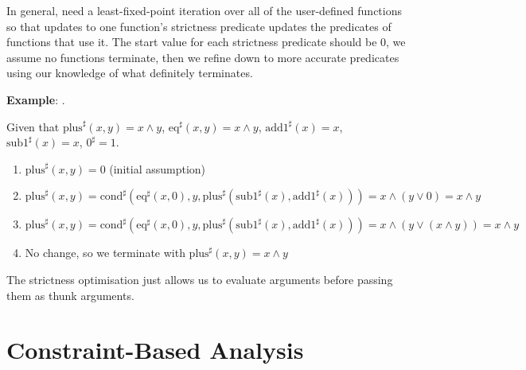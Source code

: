 \documentclass[a4paper, 11pt]{article}
\begin{document}
{    In general, need a least-fixed-point iteration over all of the user-defined functions so that updates to one function's strictness predicate updates the predicates of functions that use it. The start value for each strictness predicate should be 0, we assume no functions terminate, then we refine down to more accurate predicates using our knowledge of what definitely terminates.

    \textbf{Example}: .

    Given that \(\text{plus}^\sharp(x,y) = x \wedge y\), \(\text{eq}^\sharp(x,y) = x \wedge y\), \(\text{add1}^\sharp(x) = x\), \(\text{sub1}^\sharp(x) = x\), \(0^\sharp = 1\).
    \begin{enumerate}
    \item \(\text{plus}^\sharp(x, y) = 0\) (initial assumption)
    \item \(\text{plus}^\sharp(x, y) = \text{cond}^\sharp(\text{eq}^\sharp(x,0), y, \text{plus}^\sharp(\text{sub1}^\sharp(x), \text{add1}^\sharp(x))) = x \wedge (y \vee 0) = x \wedge y\)
    \item \(\text{plus}^\sharp(x, y) = \text{cond}^\sharp(\text{eq}^\sharp(x,0), y, \text{plus}^\sharp(\text{sub1}^\sharp(x), \text{add1}^\sharp(x))) = x \wedge (y \vee (x \wedge y)) = x \wedge y\)
    \item No change, so we terminate with \(\text{plus}^\sharp(x,y) = x \wedge y\)
    \end{enumerate}

    The strictness optimisation just allows us to evaluate arguments before passing them as thunk arguments.
}
\section*{Constraint-Based Analysis}
{

}
\end{document}
